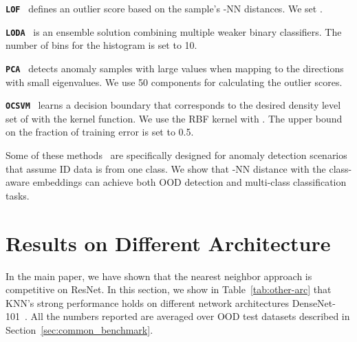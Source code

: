\documentclass[nohyperref]{article}
\newcommand{\method}{{KNN}}
\theoremstyle{plain}
\theoremstyle{definition}
\theoremstyle{remark}
\begin{document}
\texttt{\textbf{LOF}}~\citep{breunig2000lof} defines an outlier score based on the sample’s -NN distances. We set . 

\texttt{\textbf{LODA}}~\citep{2016loda} is an ensemble solution combining multiple weaker binary classifiers. The number of bins for the histogram is set to 10. 

\texttt{\textbf{PCA}}~\citep{shyu2003pca} detects anomaly samples with large values when mapping to the directions with small eigenvalues. We use 50 components for calculating the outlier scores. 

\texttt{\textbf{OCSVM}}~\citep{bernhard2001ocsvm} learns a decision
boundary that corresponds to the desired density level set
of with the kernel function. We use the RBF kernel with . The upper bound on the fraction of training error is set to 0.5. 


Some of these methods~\citep{bernhard2001ocsvm, shyu2003pca} are specifically designed for anomaly detection scenarios that assume ID data is from one class. We show that -NN distance with the class-aware embeddings can achieve both OOD detection and multi-class classification tasks. 





\section{Results on Different Architecture}
\label{sec:other_arc}
In the main paper, we have shown that the nearest neighbor approach is competitive on ResNet. In this section, we show in Table~\ref{tab:other-arc} that \method's strong performance holds on different network architectures DenseNet-101~\citep{huang2017densely}. All the numbers reported are averaged over OOD test datasets described in Section~\ref{sec:common_benchmark}. 

 
 
\end{document}
